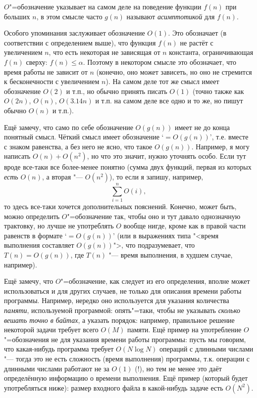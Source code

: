 {$O$"=обозначение указывает на самом деле на поведение функции $f(n)$ при больших $n$, в этом 
смысле часто $g(n)$ называют \textit{асимптотикой} для $f(n)$. 

Особого упоминания заслуживает обозначение $O(1)$. Это обозначает (в соответствии с 
определением выше), что функция $f(n)$ не растёт с увеличением $n$, что есть некоторая не 
зависящая от $n$ константа, ограничивающая $f(n)$ сверху: $f(n)\leq \alpha$. Поэтому 
в некотором смысле это обозначает, что время работы не зависит от $n$ (конечно, оно может 
зависеть, но оно не стремится к бесконечности с увеличением $n$). На самом деле тот же смысл 
имеет обозначение $O(2)$ и т.п., но обычно принять писать $O(1)$ (точно также как $O(2n)$, 
$O(n)$, $O(3.14n)$ и т.п. на самом деле все одно и то же, но пишут обычно $O(n)$ и т.п.).

Ещё замечу, что само по себе обозначение $O(g(n))$ имеет не до конца понятный смысл. Чёткий 
смысл имеет обозначение `$=O(g(n))$', т.е. вместе с знаком равенства, а без него не ясно, что 
такое $O(g(n))$. Например, я могу написать $O(n)+O(n^2)$, но что это значит, нужно уточнять 
особо. Если тут вроде все-таки все более-менее понятно (сумма двух функций, первая из которых 
\textit{есть} $O(n)$, а вторая "--- $O(n^2)$), то если я запишу, например,
$$
\sum_{i=1}^{n} O(i),
$$
то здесь все-таки хочется дополнительных пояснений. Конечно, может быть, можно определить 
$O$"=обозначение так, чтобы оно и тут давало однозначную трактовку, но лучше не употреблять $O$ 
вообще нигде, кроме как в правой части равенств в формате `$=O(g(n))$' (или в выражениях типа 
"<время выполнения составляет $O(g(n))$">, что подразумевает, что $T(n)=O(g(n))$, где $T(n)$ 
"--- время выполнения, в худшем случае, например).

Ещё замечу, что $O$"=обозначение, как следует из его определения, вполне может 
использоваться и для других случаев, не только для описания времени работы 
программы. Например, нередко оно используется для указания количества \textit{памяти}, 
используемой программой: опять"=таки, чтобы не указывать \textit{сколько вешать 
точно в байтах}, а указать порядок: например, правильное решение некоторой задачи 
требует всего $O(M)$ памяти. Ещё пример на употребление $O$"=обозначения не для указания времени работы программы: пусть мы говорим, что какая-нибудь программа требует $O(N\log N)$ 
операций с длинными числами "--- тогда это не есть сложность (время выполнения) 
программы, т.к. операции с длинными числами работают не за $O(1)$ (!), но тем не менее это даёт определённую информацию о времени выполнения. 
Ещё пример (который будет употребляться ниже): размер входного файла в 
какой-нибудь задаче есть $O(N^2)$.

}
